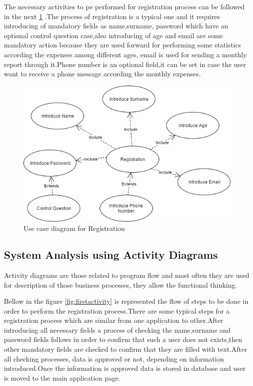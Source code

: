 The necessary activities to pe performed for registration process can be followed in the next \ref{fig:thirdusecase} .The process of registration is a typical one and it requires introducing of mandatory fields as  name,surname, password which have an optional control question case,also introducing of age and email are some mandatory action because they are used forward for performing some statistics according the expenses among different ages, email is used for sending a monthly report through it.Phone number is an optional field,it can be set in case the user want to receive a phone message according the monthly expenses.
\begin{figure}[H]
	\centering
	\includegraphics[width=18cm]{Chapter2/usecasereg.png}
	\caption{Use case diagram for Registration}
	\label{fig:thirdusecase}
\end{figure}

\subsection{System Analysis using Activity Diagrams}
Activity diagrams are those related to program flow and most often they are used for description of those business processes, they allow the functional thinking. 

Bellow in the figure \ref{fig:firstactivity} is represented the flow of steps to be done in order to perform the registration process.There are some typical steps for a registration process which are similar from one application to other.After introducing all necessary fields a process of checking the name,surname and password fields follows in order to confirm that such a user does not exists,then other mandatory fields are checked to confirm that they are filled with text.After all checking processes, data is approved or not, depending on information introduced.Once the information is approved data is stored in database and user is moved to the main application page.

